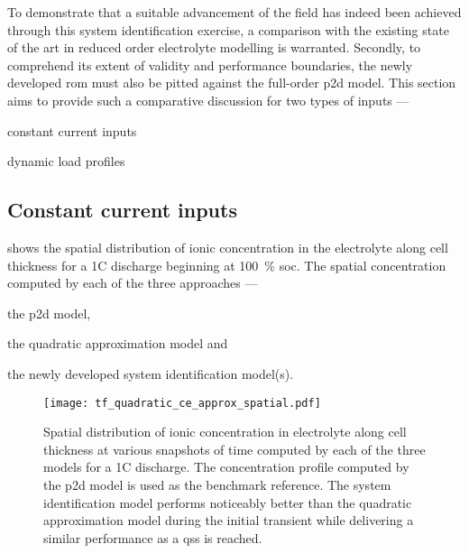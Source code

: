 
To demonstrate that a suitable advancement of the field has indeed been achieved
through  this system  identification exercise,  a comparison  with the  existing
state of the art in reduced  order electrolyte modelling is warranted. Secondly,
to  comprehend its  extent of  validity  and performance  boundaries, the  newly
developed \gls{rom} must also be  pitted against the full-order \gls{p2d} model.
This section  aims to  provide such  a comparative discussion  for two  types of
inputs ---
\begin{enumerate*}[label=\itshape\alph*\upshape)]
    \item constant current inputs
    \item dynamic load profiles
\end{enumerate*}

\subsection{Constant current inputs}\label{subsec:tfquadceconstcurrinput}

 shows  the spatial distribution  of ionic
concentration  in  the electrolyte  along  cell  thickness  for a  1C  discharge
beginning at \SI{100}{\percent} \gls{soc}. The spatial concentration computed by
each of the three approaches ---
\begin{enumerate*}[label=\roman*)]
    \item the \gls{p2d} model,
    \item the quadratic approximation model and
    \item the newly developed system identification model(s).
\end{enumerate*}

\begin{figure}[!htbp]
    \centering
    \texttt{[image: tf\_quadratic\_ce\_approx\_spatial.pdf]}
    \caption[Spatial distribution of ionic concentration in
    electrolyte for a 1C discharge computed by the , quadratic
    approximation \& system identification models]{%
        Spatial distribution of ionic concentration  in electrolyte along cell
        thickness at various  snapshots of  time computed  by each of  the three
        models for  a 1C discharge.  The concentration  profile  computed by
        the  \gls{p2d} model is used as the benchmark reference. The  system
        identification model performs noticeably better than the quadratic
        approximation model during  the initial  transient  while delivering a
        similar performance as a \gls{qss} is reached.
}%
\label{fig:tfquadp2dspatialionicconc1C}
\end{figure}

